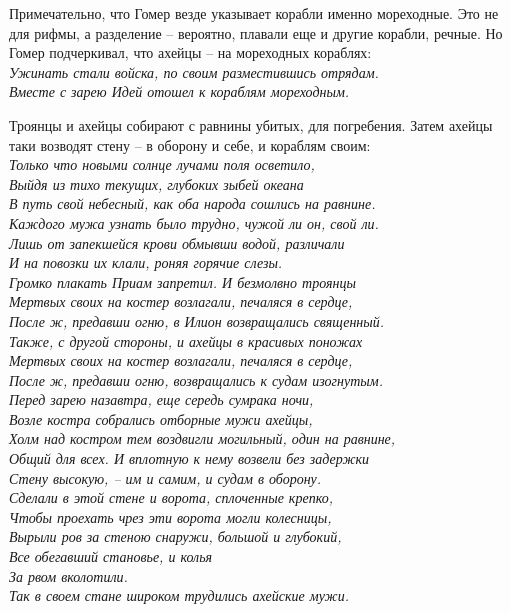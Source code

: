 Примечательно, что Гомер везде указывает корабли именно мореходные. Это не для рифмы, а разделение – вероятно, плавали еще и другие корабли, речные. Но Гомер подчеркивал, что ахейцы – на мореходных кораблях:\\

\noindent
\textit{Ужинать стали войска, по своим разместившись отрядам.\\
Вместе с зарею Идей отошел к кораблям мореходным.\\}

Троянцы и ахейцы собирают с равнины убитых, для погребения. Затем ахейцы таки возводят стену – в оборону и себе, и кораблям своим:\\

\noindent
\textit{Только что новыми солнце лучами поля осветило,\\
Выйдя из тихо текущих, глубоких зыбей океана\\
В путь свой небесный, как оба народа сошлись на равнине.\\
Каждого мужа узнать было трудно, чужой ли он, свой ли.\\
Лишь от запекшейся крови обмывши водой, различали\\
И на повозки их клали, роняя горячие слезы.\\
Громко плакать Приам запретил. И безмолвно троянцы\\
Мертвых своих на костер возлагали, печаляся в сердце,\\
После ж, предавши огню, в Илион возвращались священный.\\
Также, с другой стороны, и ахейцы в красивых поножах\\
Мертвых своих на костер возлагали, печаляся в сердце,\\
После ж, предавши огню, возвращались к судам изогнутым.\\
Перед зарею назавтра, еще середь сумрака ночи,\\
Возле костра собрались отборные мужи ахейцы,\\
Холм над костром тем воздвигли могильный, один на равнине,\\
Общий для всех. И вплотную к нему возвели без задержки\\
Стену высокую, – им и самим, и судам в оборону.\\
Сделали в этой стене и ворота, сплоченные крепко,\\
Чтобы проехать чрез эти ворота могли колесницы,\\
Вырыли ров за стеною снаружи, большой и глубокий,\\
Все обегавший становье, и колья\\ 
За рвом вколотили.\\
Так в своем стане широком трудились ахейские мужи.\\}

